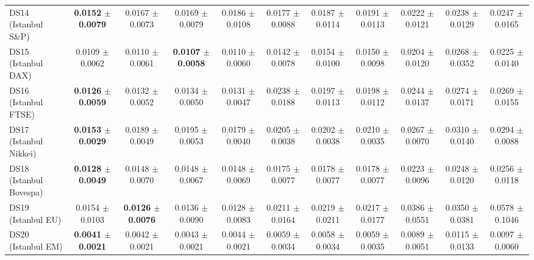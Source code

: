 \begin{table}[t]
{{\begin{tabular}{lcccccccccc}
DS14 (Istanbul S\&P) & \textbf{0.0152} $\pm$ \textbf{0.0079} & 0.0167 $\pm$ 0.0073 & 0.0169 $\pm$ 0.0079 & 0.0186 $\pm$ 0.0108 & 0.0177 $\pm$ 0.0088 & 0.0187 $\pm$ 0.0114 & 0.0191 $\pm$ 0.0113 & 0.0222 $\pm$ 0.0121 & 0.0238 $\pm$ 0.0129 & 0.0247 $\pm$ 0.0165 \\
DS15 (Istanbul DAX) & 0.0109 $\pm$ 0.0062 & 0.0110 $\pm$ 0.0061 & \textbf{0.0107} $\pm$ \textbf{0.0058} & 0.0110 $\pm$ 0.0060 & 0.0142 $\pm$ 0.0078 & 0.0154 $\pm$ 0.0100 & 0.0150 $\pm$ 0.0098 & 0.0204 $\pm$ 0.0120 & 0.0268 $\pm$ 0.0352 & 0.0225 $\pm$ 0.0140 \\
DS16 (Istanbul FTSE) & \textbf{0.0126} $\pm$ \textbf{0.0059} & 0.0132 $\pm$ 0.0052 & 0.0134 $\pm$ 0.0050 & 0.0131 $\pm$ 0.0047 & 0.0238 $\pm$ 0.0188 & 0.0197 $\pm$ 0.0113 & 0.0198 $\pm$ 0.0112 & 0.0244 $\pm$ 0.0137 & 0.0274 $\pm$ 0.0171 & 0.0269 $\pm$ 0.0155 \\
DS17 (Istanbul Nikkei) & \textbf{0.0153} $\pm$ \textbf{0.0029} & 0.0189 $\pm$ 0.0049 & 0.0195 $\pm$ 0.0053 & 0.0179 $\pm$ 0.0040 & 0.0205 $\pm$ 0.0038 & 0.0202 $\pm$ 0.0038 & 0.0210 $\pm$ 0.0035 & 0.0267 $\pm$ 0.0070 & 0.0310 $\pm$ 0.0140 & 0.0294 $\pm$ 0.0088 \\
DS18 (Istanbul Bovespa) & \textbf{0.0128} $\pm$ \textbf{0.0049} & 0.0148 $\pm$ 0.0070 & 0.0148 $\pm$ 0.0067 & 0.0148 $\pm$ 0.0069 & 0.0175 $\pm$ 0.0077 & 0.0178 $\pm$ 0.0077 & 0.0178 $\pm$ 0.0077 & 0.0223 $\pm$ 0.0096 & 0.0248 $\pm$ 0.0120 & 0.0256 $\pm$ 0.0118 \\
DS19 (Istanbul EU) & 0.0154 $\pm$ 0.0103 & \textbf{0.0126} $\pm$ \textbf{0.0076} & 0.0136 $\pm$ 0.0090 & 0.0128 $\pm$ 0.0083 & 0.0211 $\pm$ 0.0164 & 0.0219 $\pm$ 0.0211 & 0.0217 $\pm$ 0.0177 & 0.0386 $\pm$ 0.0551 & 0.0350 $\pm$ 0.0381 & 0.0578 $\pm$ 0.1046 \\
DS20 (Istanbul EM) & \textbf{0.0041} $\pm$ \textbf{0.0021} & 0.0042 $\pm$ 0.0021 & 0.0043 $\pm$ 0.0021 & 0.0044 $\pm$ 0.0021 & 0.0059 $\pm$ 0.0034 & 0.0058 $\pm$ 0.0034 & 0.0059 $\pm$ 0.0035 & 0.0089 $\pm$ 0.0051 & 0.0115 $\pm$ 0.0133 & 0.0097 $\pm$ 0.0060 \\
\bottomrule
\end{tabular}%
}%
}
\end{table}
